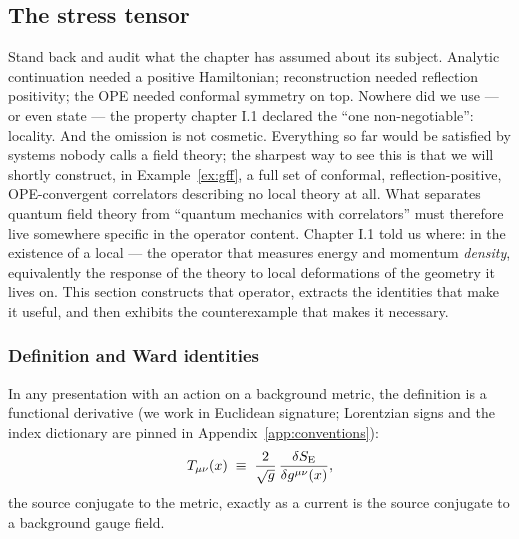 \subsection{The stress tensor}
\label{sec:stress-tensor}

Stand back and audit what the chapter has assumed about its subject. Analytic
continuation needed a positive Hamiltonian; reconstruction needed reflection
positivity; the OPE needed conformal symmetry on top. Nowhere did we use ---
or even state --- the property chapter I.1 declared the ``one non-negotiable'':
locality. And the omission is not cosmetic. Everything so far would be
satisfied by systems nobody calls a field theory; the sharpest way to see this
is that we will shortly construct, in Example~\ref{ex:gff}, a full set of
conformal, reflection-positive, OPE-convergent correlators describing no local
theory at all. What separates quantum field theory from ``quantum mechanics
with correlators'' must therefore live somewhere specific in the operator
content. Chapter I.1 told us where: in the existence of a local  --- the operator that measures energy and momentum \emph{density},
equivalently the response of the theory to local deformations of the geometry
it lives on. This section constructs that operator, extracts the identities
that make it useful, and then exhibits the counterexample that makes it
necessary.

\subsubsection{Definition and Ward identities}

In any presentation with an action on a background metric, the definition is a
functional derivative (we work in Euclidean signature; Lorentzian signs and
the index dictionary are pinned in Appendix~\ref{app:conventions}):
\begin{equation}
T_{\mu\nu}(x) \;\equiv\; \frac{2}{\sqrt{g}}\,
\frac{\delta S_{\rm E}}{\delta g^{\mu\nu}(x)} ,
\label{eq:stress-def}
\end{equation}
the source conjugate to the metric, exactly as a current is the source
conjugate to a background gauge field.

